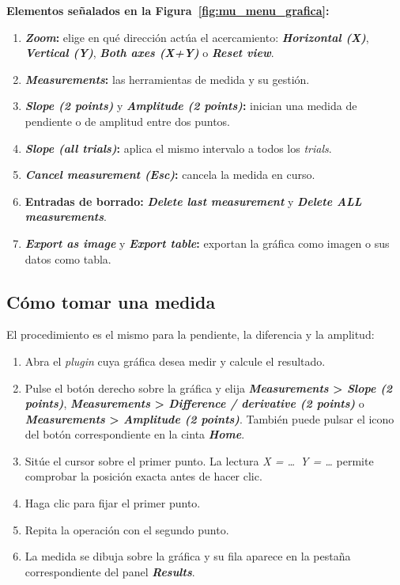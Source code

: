 \documentclass[11pt,a4paper]{article}
\newenvironment{senalamientos}[1]{%
  \par\noindent\textbf{Elementos se\~nalados en la Figura~\ref{#1}:}%
  \begin{enumerate}[label=(\arabic*),leftmargin=2.4em,itemsep=2pt,topsep=4pt]}
  {\end{enumerate}}
\begin{document}
    \begin{senalamientos}{fig:mu_menu_grafica}
        \item \textbf{\textit{Zoom}:} elige en qu\'e direcci\'on act\'ua el acercamiento: \textbf{\textit{Horizontal (X)}}, \textbf{\textit{Vertical (Y)}}, \textbf{\textit{Both axes (X+Y)}} o \textbf{\textit{Reset view}}.
        \item \textbf{\textit{Measurements}:} las herramientas de medida y su gesti\'on.
        \item \textbf{\textit{Slope (2 points)}} y \textbf{\textit{Amplitude (2 points)}:} inician una medida de pendiente o de amplitud entre dos puntos.
        \item \textbf{\textit{Slope (all trials)}:} aplica el mismo intervalo a todos los \textit{trials}.
        \item \textbf{\textit{Cancel measurement (Esc)}:} cancela la medida en curso.
        \item \textbf{Entradas de borrado:} \textbf{\textit{Delete last measurement}} y \textbf{\textit{Delete ALL measurements}}.
        \item \textbf{\textit{Export as image}} y \textbf{\textit{Export table}:} exportan la gr\'afica como imagen o sus datos como tabla.
    \end{senalamientos}


    \subsection{C\'omo tomar una medida}
    El procedimiento es el mismo para la pendiente, la diferencia y la amplitud:

    \begin{enumerate}
        \item Abra el \textit{plugin} cuya gr\'afica desea medir y calcule el resultado.
        \item Pulse el bot\'on derecho sobre la gr\'afica y elija \textbf{\textit{Measurements} > \textit{Slope (2 points)}}, \textbf{\textit{Measurements} > \textit{Difference / derivative (2 points)}} o \textbf{\textit{Measurements} > \textit{Amplitude (2 points)}}. Tambi\'en puede pulsar el icono del bot\'on correspondiente en la cinta \textbf{\textit{Home}}.
        \item Sit\'ue el cursor sobre el primer punto. La lectura \textit{X = \ldots\ Y = \ldots} permite comprobar la posici\'on exacta antes de hacer clic.
        \item Haga clic para fijar el primer punto.
        \item Repita la operaci\'on con el segundo punto.
        \item La medida se dibuja sobre la gr\'afica y su fila aparece en la pesta\~na correspondiente del panel \textbf{\textit{Results}}.
    \end{enumerate}
\end{document}
